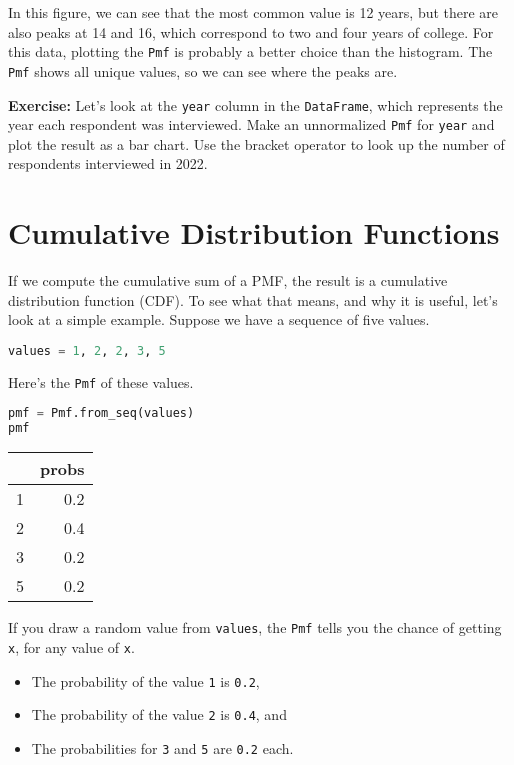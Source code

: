 In this figure, we can see that the most common value is 12 years, but
there are also peaks at 14 and 16, which correspond to two and four
years of college. For this data, plotting the
\passthrough{\lstinline!Pmf!} is probably a better choice than the
histogram. The \passthrough{\lstinline!Pmf!} shows all unique values, so
we can see where the peaks are.

\textbf{Exercise:} Let's look at the \passthrough{\lstinline!year!}
column in the \passthrough{\lstinline!DataFrame!}, which represents the
year each respondent was interviewed. Make an unnormalized
\passthrough{\lstinline!Pmf!} for \passthrough{\lstinline!year!} and
plot the result as a bar chart. Use the bracket operator to look up the
number of respondents interviewed in 2022.

\section{Cumulative Distribution
Functions}\label{cumulative-distribution-functions}

If we compute the cumulative sum of a PMF, the result is a cumulative
distribution function (CDF). To see what that means, and why it is
useful, let's look at a simple example. Suppose we have a sequence of
five values.

\begin{lstlisting}[language=Python,style=source]
values = 1, 2, 2, 3, 5  
\end{lstlisting}

Here's the \passthrough{\lstinline!Pmf!} of these values.

\begin{lstlisting}[language=Python,style=source]
pmf = Pmf.from_seq(values)
pmf
\end{lstlisting}

\begin{tabular}{lr}
\midrule
 & probs \\
\midrule
1 & 0.2 \\
2 & 0.4 \\
3 & 0.2 \\
5 & 0.2 \\
\midrule
\end{tabular}

If you draw a random value from \passthrough{\lstinline!values!}, the
\passthrough{\lstinline!Pmf!} tells you the chance of getting
\passthrough{\lstinline!x!}, for any value of
\passthrough{\lstinline!x!}.

\begin{itemize}
\item
  The probability of the value \passthrough{\lstinline!1!} is
  \passthrough{\lstinline!0.2!},
\item
  The probability of the value \passthrough{\lstinline!2!} is
  \passthrough{\lstinline!0.4!}, and
\item
  The probabilities for \passthrough{\lstinline!3!} and
  \passthrough{\lstinline!5!} are \passthrough{\lstinline!0.2!} each.
\end{itemize}

